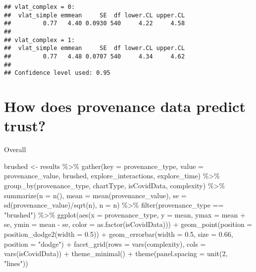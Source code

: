 \documentclass[
]{article}
\newenvironment{Shaded}{\begin{snugshade}}{\end{snugshade}}
\newcommand{\AttributeTok}[1]{\textcolor[rgb]{0.77,0.63,0.00}{#1}}
\newcommand{\DecValTok}[1]{\textcolor[rgb]{0.00,0.00,0.81}{#1}}
\newcommand{\FloatTok}[1]{\textcolor[rgb]{0.00,0.00,0.81}{#1}}
\newcommand{\FunctionTok}[1]{\textcolor[rgb]{0.00,0.00,0.00}{#1}}
\newcommand{\NormalTok}[1]{#1}
\newcommand{\OtherTok}[1]{\textcolor[rgb]{0.56,0.35,0.01}{#1}}
\newcommand{\SpecialCharTok}[1]{\textcolor[rgb]{0.00,0.00,0.00}{#1}}
\newcommand{\StringTok}[1]{\textcolor[rgb]{0.31,0.60,0.02}{#1}}
\begin{document}
\begin{verbatim}
## vlat_complex = 0:
##  vlat_simple emmean     SE  df lower.CL upper.CL
##         0.77   4.40 0.0930 540     4.22     4.58
## 
## vlat_complex = 1:
##  vlat_simple emmean     SE  df lower.CL upper.CL
##         0.77   4.48 0.0707 540     4.34     4.62
## 
## Confidence level used: 0.95
\end{verbatim}

\hypertarget{how-does-provenance-data-predict-trust}{%
\section{How does provenance data predict
trust?}\label{how-does-provenance-data-predict-trust}}

Overall

\begin{Shaded}
\begin{Highlighting}[]
\NormalTok{brushed }\OtherTok{\textless{}{-}}\NormalTok{ results }\SpecialCharTok{\%\textgreater{}\%}
  \FunctionTok{gather}\NormalTok{(}\AttributeTok{key =}\NormalTok{ provenance\_type, }\AttributeTok{value =}\NormalTok{ provenance\_value, brushed, explore\_interactions, explore\_time) }\SpecialCharTok{\%\textgreater{}\%}
  \FunctionTok{group\_by}\NormalTok{(provenance\_type, chartType, isCovidData, complexity) }\SpecialCharTok{\%\textgreater{}\%}
  \FunctionTok{summarize}\NormalTok{(}\AttributeTok{n =} \FunctionTok{n}\NormalTok{(), }
            \AttributeTok{mean =} \FunctionTok{mean}\NormalTok{(provenance\_value), }
            \AttributeTok{se =} \FunctionTok{sd}\NormalTok{(provenance\_value)}\SpecialCharTok{/}\FunctionTok{sqrt}\NormalTok{(n),}
            \AttributeTok{n =}\NormalTok{ n) }\SpecialCharTok{\%\textgreater{}\%}
  \FunctionTok{filter}\NormalTok{(provenance\_type }\SpecialCharTok{==} \StringTok{"brushed"}\NormalTok{) }\SpecialCharTok{\%\textgreater{}\%}
  \FunctionTok{ggplot}\NormalTok{(}\FunctionTok{aes}\NormalTok{(}\AttributeTok{x =}\NormalTok{ provenance\_type, }\AttributeTok{y =}\NormalTok{ mean, }\AttributeTok{ymax =}\NormalTok{ mean }\SpecialCharTok{+}\NormalTok{ se, }\AttributeTok{ymin =}\NormalTok{ mean }\SpecialCharTok{{-}}\NormalTok{ se, }\AttributeTok{color =} \FunctionTok{as.factor}\NormalTok{(isCovidData))) }\SpecialCharTok{+}
  \FunctionTok{geom\_point}\NormalTok{(}\AttributeTok{position =} \FunctionTok{position\_dodge2}\NormalTok{(}\AttributeTok{width =} \FloatTok{0.5}\NormalTok{)) }\SpecialCharTok{+}
  \FunctionTok{geom\_errorbar}\NormalTok{(}\AttributeTok{width =} \FloatTok{0.5}\NormalTok{, }\AttributeTok{size =} \FloatTok{0.66}\NormalTok{, }\AttributeTok{position =} \StringTok{"dodge"}\NormalTok{) }\SpecialCharTok{+}
  \FunctionTok{facet\_grid}\NormalTok{(}\AttributeTok{rows =} \FunctionTok{vars}\NormalTok{(complexity), }\AttributeTok{cols =} \FunctionTok{vars}\NormalTok{(isCovidData)) }\SpecialCharTok{+} 
  \FunctionTok{theme\_minimal}\NormalTok{() }\SpecialCharTok{+}
  \FunctionTok{theme}\NormalTok{(}\AttributeTok{panel.spacing =} \FunctionTok{unit}\NormalTok{(}\DecValTok{2}\NormalTok{, }\StringTok{"lines"}\NormalTok{))}
\end{Highlighting}
\end{Shaded}
\end{document}
